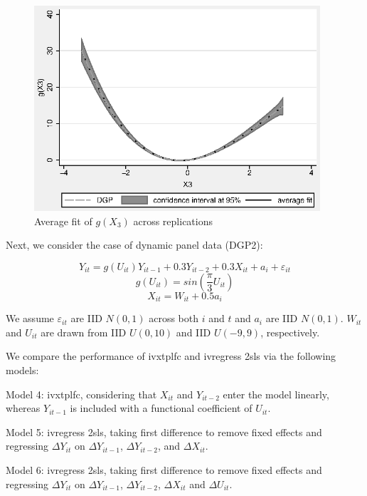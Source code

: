 \begin{figure}[h]
	\begin{centering}
		\includegraphics[height=3in]{fig1}
		\caption{Average fit of $g(X_{3})$ across replications}
		\label{fig1}
	\end{centering}
\end{figure}


Next, we consider the case of dynamic panel data (DGP2):

\begin{equation}
Y_{it}=g(U_{it})Y_{it-1}+0.3Y_{it-2}+0.3X_{it}+a_{i}+\varepsilon_{it}
\end{equation}
\begin{equation}
g(U_{it})=sin(\frac{\pi}{3}U_{it})
\end{equation}
\begin{equation}
X_{it}=W_{it}+0.5a_{i}
\end{equation}

We assume $\varepsilon_{it}$ are IID $N(0,1)$ across both $i$ and $t$ and $a_{i}$ are IID $N(0,1)$. $W_{it}$ and $U_{it}$ are drawn from IID $U(0,10)$ and IID $U(-9,9)$, respectively.

We compare the performance of ivxtplfc and ivregress 2sls via the following models:

Model 4: ivxtplfc, considering that $X_{it}$ and $Y_{it-2}$ enter the model linearly, whereas $Y_{it-1}$ is included with a functional coefficient of $U_{it}$.

Model 5: ivregress 2sls, taking first difference to remove fixed effects and regressing $\Delta Y_{it}$ on $\Delta Y_{it-1}$, $\Delta Y_{it-2}$, and $\Delta X_{it}$.

Model 6: ivregress 2sls, taking first difference to remove fixed effects and regressing $\Delta Y_{it}$ on $\Delta Y_{it-1}$, $\Delta Y_{it-2}$, $\Delta X_{it}$ and $\Delta U_{it}$.


